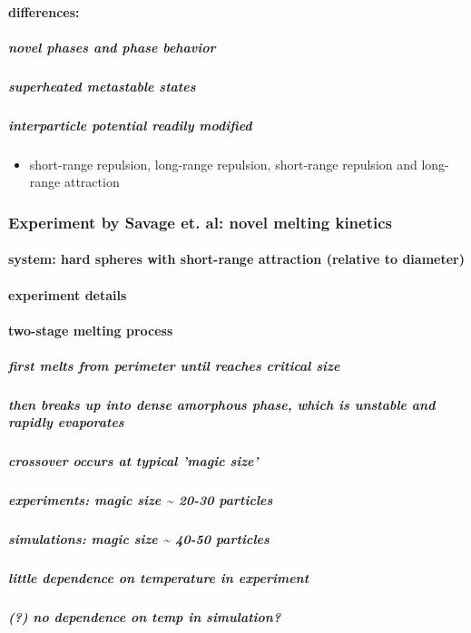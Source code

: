 \documentclass{article}
\begin{document}
\paragraph{differences:}
\label{sec-2.1.1.2}
\subparagraph{novel phases and phase behavior}
\label{sec-2.1.1.2.1}
\subparagraph{superheated metastable states}
\label{sec-2.1.1.2.2}
\subparagraph{interparticle potential readily modified}
\label{sec-2.1.1.2.3}
\begin{itemize}

\item short-range repulsion, long-range repulsion, short-range repulsion and long-range attraction\\
\label{sec-2.1.1.2.3.1}%
\end{itemize} %
\subsubsection{Experiment by Savage et. al: novel melting kinetics}
\label{sec-2.1.2}
\paragraph{system: hard spheres with short-range attraction (relative to diameter)}
\label{sec-2.1.2.1}
\paragraph{experiment details}
\label{sec-2.1.2.2}
\paragraph{two-stage melting process}
\label{sec-2.1.2.3}
\subparagraph{first melts from perimeter until reaches critical size}
\label{sec-2.1.2.3.1}
\subparagraph{then breaks up into dense amorphous phase, which is unstable and rapidly evaporates}
\label{sec-2.1.2.3.2}
\subparagraph{crossover occurs at typical 'magic size'}
\label{sec-2.1.2.3.3}
\subparagraph{experiments: magic size \~{} 20-30 particles}
\label{sec-2.1.2.3.4}
\subparagraph{simulations: magic size \~{} 40-50 particles}
\label{sec-2.1.2.3.5}
\subparagraph{little dependence on temperature in experiment}
\label{sec-2.1.2.3.6}
\subparagraph{(?) no dependence on temp in simulation?}
\label{sec-2.1.2.3.7}
\end{document}
